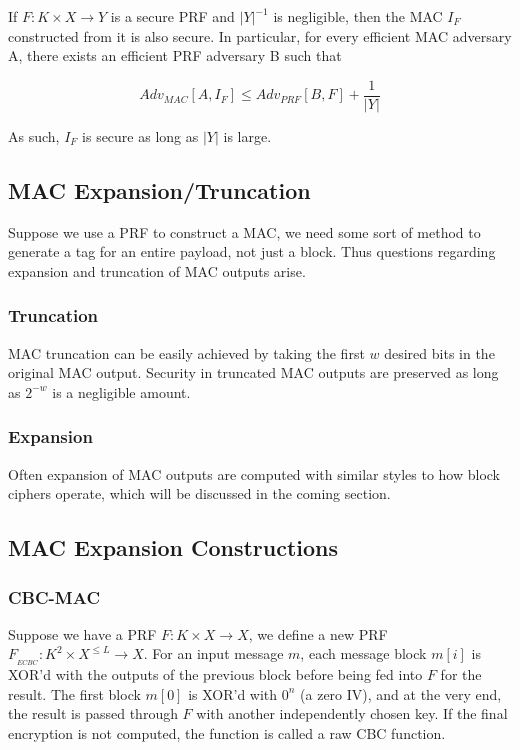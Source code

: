 \documentclass{article}
\begin{document}
\begin{multicols}{2}
If $F: K \times X \rightarrow Y$ is a secure PRF and $|Y|^{-1}$ is negligible, then the MAC $I_F$ constructed from it is also secure. In particular, for every efficient MAC adversary A, there exists an efficient PRF adversary B such that

$$
Adv_{MAC}[A,I_F] \leq Adv_{PRF}[B,F] + \frac{1}{|Y|}
$$

As such, $I_F$ is secure as long as $|Y|$ is large.

\subsection{MAC Expansion/Truncation}

Suppose we use a PRF to construct a MAC, we need some sort of method to generate a tag for an entire payload, not just a block. Thus questions regarding expansion and truncation of MAC outputs arise.

\subsubsection{Truncation}

MAC truncation can be easily achieved by taking the first $w$ desired bits in the original MAC output. Security in truncated MAC outputs are preserved as long as $2^{-w}$ is a negligible amount.

\subsubsection{Expansion}

Often expansion of MAC outputs are computed with similar styles to how block ciphers operate, which will be discussed in the coming section.


\subsection{MAC Expansion Constructions}

\subsubsection{CBC-MAC}

Suppose we have a PRF $F: K \times X \rightarrow X$, we define a new PRF $F_{_{ECBC}} : K^2 \times X^{\leq L} \rightarrow X$. For an input message $m$, each message block $m[i]$ is XOR'd with the outputs of the previous block before being fed into $F$ for the result. The first block $m[0]$ is XOR'd with $0^n$ (a zero IV), and at the very end, the result is passed through $F$ with another independently chosen key. If the final encryption is not computed, the function is called a raw CBC function.


\end{multicols}
\end{document}
